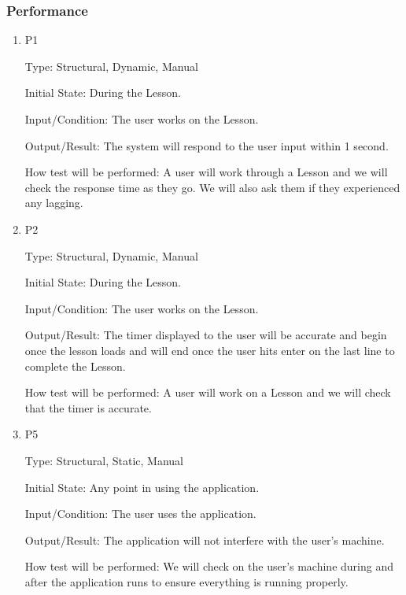 \documentclass[12pt, titlepage]{article}
\begin{document}
\subsubsection{Performance}
\begin{enumerate}

\item{{\color{cyan}P1}\\}

Type: Structural, Dynamic, Manual
					
Initial State: During the Lesson.
					
Input/Condition: The user works on the Lesson.
					
Output/Result: The system will respond to the user input within 1 second.
					
How test will be performed: A user will work through a Lesson and we will check the response time as they go.{\color{cyan} We will also ask them if they experienced any lagging.} 

\item{{\color{cyan}P2}\\}

Type: Structural, Dynamic, Manual
					
Initial State: During the Lesson.
					
Input/Condition: The user works on the Lesson.
					
Output/Result: The timer displayed to the user will be accurate and begin once the {\color{cyan}lesson loads} and will end once the user hits enter {\color{cyan} on the last line} to complete the Lesson.
					
How test will be performed: A user will work on a Lesson and we will check that the timer is accurate.

\item{{\color{cyan}P5}\\}

Type: Structural, Static, Manual
					
Initial State: Any point in using the application.
					
Input/Condition: The user uses the application.
					
Output/Result: The application will not interfere with the user's machine.
					
How test will be performed: We will check on the user's machine during and after the application runs to ensure everything is running properly.

\end{enumerate}
\end{document}
